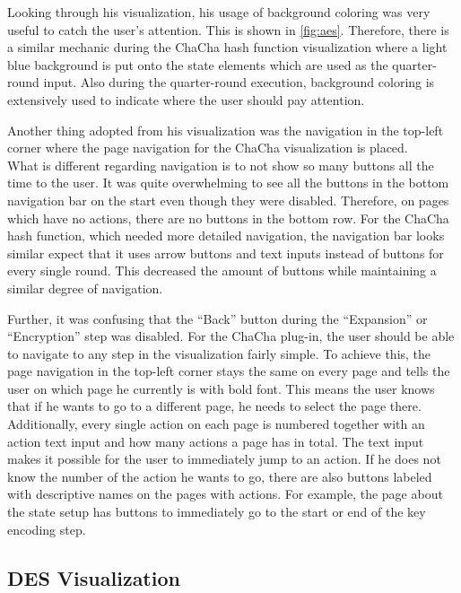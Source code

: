 Looking through his visualization, his usage of background coloring was very useful to catch the user's attention. This is shown in \autoref{fig:aes}. Therefore, there is a similar mechanic during the ChaCha hash function visualization where a light blue background is put onto the state elements which are used as the quarter-round input. Also during the quarter-round execution, background coloring is extensively used to indicate where the user should pay attention.

Another thing adopted from his visualization was the navigation in the top-left corner where the page navigation for the ChaCha visualization is placed. \\
What is different regarding navigation is to not show so many buttons all the time to the user. It was quite overwhelming to see all the buttons in the bottom navigation bar on the start even though they were disabled. Therefore, on pages which have no actions, there are no buttons in the bottom row. For the ChaCha hash function, which needed more detailed navigation, the navigation bar looks similar expect that it uses arrow buttons and text inputs instead of buttons for every single round. This decreased the amount of buttons while maintaining a similar degree of navigation.

Further, it was confusing that the ``Back'' button during the ``Expansion'' or ``Encryption'' step was disabled. For the ChaCha plug-in, the user should be able to navigate to any step in the visualization fairly simple. To achieve this, the page navigation in the top-left corner stays the same on every page and tells the user on which page he currently is with bold font. This means the user knows that if he wants to go to a different page, he needs to select the page there. Additionally, every single action on each page is numbered together with an action text input and how many actions a page has in total. The text input makes it possible for the user to immediately jump to an action. If he does not know the number of the action he wants to go, there are also buttons labeled with descriptive names on the pages with actions. For example, the page about the state setup has buttons to immediately go to the start or end of the key encoding step.

\subsection{DES Visualization}
\label{sec:desVisualization}

